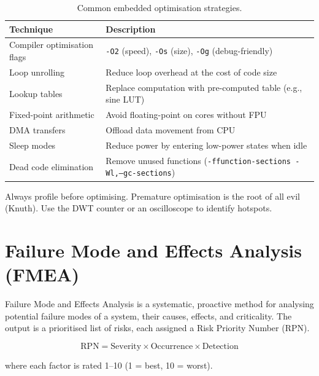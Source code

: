 \begin{table}[H]
\centering
\caption{Common embedded optimisation strategies.}
\label{tab:ana:optim}
\begin{tabularx}{\linewidth}{@{}lX@{}}
\toprule
\textbf{Technique} & \textbf{Description} \\
\midrule
Compiler optimisation flags & \texttt{-O2} (speed), \texttt{-Os} (size), \texttt{-Og} (debug-friendly) \\
Loop unrolling & Reduce loop overhead at the cost of code size \\
Lookup tables & Replace computation with pre-computed table (e.g., sine LUT) \\
Fixed-point arithmetic & Avoid floating-point on cores without FPU \\
DMA transfers & Offload data movement from CPU \\
Sleep modes & Reduce power by entering low-power states when idle \\
Dead code elimination & Remove unused functions (\texttt{-ffunction-sections -Wl,--gc-sections}) \\
\bottomrule
\end{tabularx}
\end{table}

\begin{practicalNote}
Always profile before optimising. Premature optimisation is the root of all evil (Knuth). Use the DWT counter or an oscilloscope to identify hotspots.
\end{practicalNote}

\section{Failure Mode and Effects Analysis (FMEA)}
\label{sec:ana:fmea}

\begin{definition}[FMEA]
Failure Mode and Effects Analysis is a systematic, proactive method for analysing potential failure modes of a system, their causes, effects, and criticality. The output is a prioritised list of risks, each assigned a Risk Priority Number (RPN).
\end{definition}

\[
\text{RPN} = \text{Severity} \times \text{Occurrence} \times \text{Detection}
\]

where each factor is rated 1--10 (1 = best, 10 = worst).

